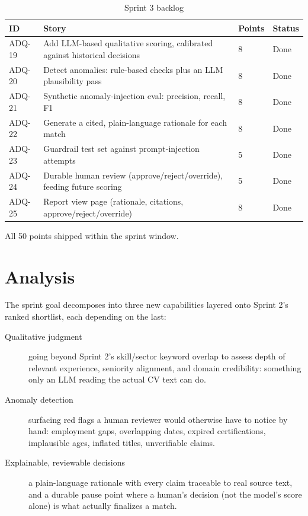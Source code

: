 \begin{table}[H]
  \centering
  \caption{Sprint 3 backlog}
  \label{tab:sprint3-backlog}
  \begin{tabular}{@{}p{1.7cm}p{11.2cm}p{1.3cm}p{2.7cm}@{}}
    \toprule
    ID & Story & Points & Status \\
    \midrule
    ADQ-19 & Add LLM-based qualitative scoring, calibrated against historical decisions & 8 & Done \\
    ADQ-20 & Detect anomalies: rule-based checks plus an LLM plausibility pass & 8 & Done \\
    ADQ-21 & Synthetic anomaly-injection eval: precision, recall, F1 & 8 & Done \\
    ADQ-22 & Generate a cited, plain-language rationale for each match & 8 & Done \\
    ADQ-23 & Guardrail test set against prompt-injection attempts & 5 & Done \\
    ADQ-24 & Durable human review (approve/reject/override), feeding future scoring & 5 & Done \\
    ADQ-25 & Report view page (rationale, citations, approve/reject/override) & 8 & Done \\
    \bottomrule
  \end{tabular}
\end{table}

All 50 points shipped within the sprint window.

\section{Analysis}
\label{sec:s3-analysis}

The sprint goal decomposes into three new capabilities layered onto
Sprint 2's ranked shortlist, each depending on the last:

\begin{description}
  \item[Qualitative judgment] going beyond Sprint 2's skill/sector
    keyword overlap to assess depth of relevant experience, seniority
    alignment, and domain credibility: something only an LLM reading
    the actual CV text can do.
  \item[Anomaly detection] surfacing red flags a human reviewer would
    otherwise have to notice by hand: employment gaps, overlapping
    dates, expired certifications, implausible ages, inflated titles,
    unverifiable claims.
  \item[Explainable, reviewable decisions] a plain-language rationale
    with every claim traceable to real source text, and a durable pause
    point where a human's decision (not the model's score alone)
    is what actually finalizes a match.
\end{description}

